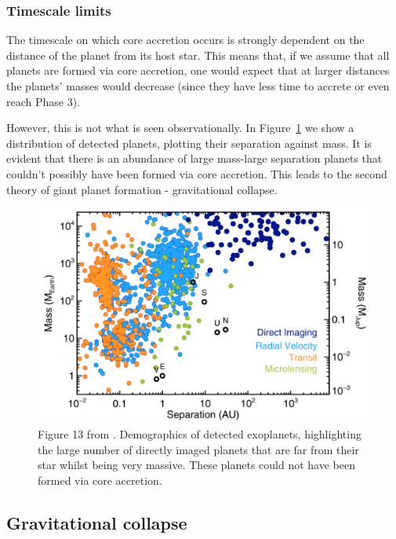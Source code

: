 \documentclass[twocolumn]{aastex631}
\begin{document}
\subsubsection{Timescale limits}

The timescale on which core accretion occurs is strongly dependent on the distance of the planet from its host star. This means that, if we assume that all planets are formed via core accretion, one would expect that at larger distances the planets' masses would decrease (since they have less time to accrete or even reach Phase 3).

However, this is not what is seen observationally. In Figure~\ref{fig:demographics} we show a distribution of detected planets, plotting their separation against mass. It is evident that there is an abundance of large mass-large separation planets that couldn't possibly have been formed via core accretion. This leads to the second theory of giant planet formation - gravitational collapse.

\begin{figure}[tb]
    \centering
    \includegraphics[width=\columnwidth]{exoplanet_demographics.png}
    \caption{Figure 13 from \citet{Bowler+2016}. Demographics of detected exoplanets, highlighting the large number of directly imaged planets that are far from their star whilst being very massive. These planets could not have been formed via core accretion.}
    \label{fig:demographics}
\end{figure}

\subsection{Gravitational collapse}
\end{document}
